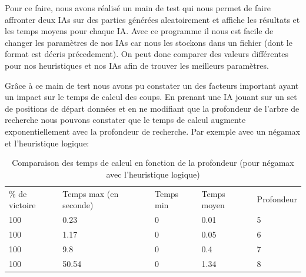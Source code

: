 \documentclass[12pt]{article}
\begin{document}
Pour ce faire, nous avons réalisé un main de test qui nous permet de faire affronter deux IAs sur des parties générées aleatoirement et affiche les résultats et les temps moyens pour chaque IA. Avec ce programme il nous est facile de changer les paramètres de nos IAs car nous les stockons dans un fichier (dont le format est décris précedement). On peut donc comparer des valeurs différentes pour nos heuristiques et nos IAs afin de trouver les meilleurs paramètres.

Grâce à ce main de test nous avons pu constater un des facteurs important ayant un impact sur le temps de calcul des coups. En prenant une IA jouant sur un set de positions de départ données et en ne modifiant que la profondeur de l'arbre de recherche nous pouvons constater que le temps de calcul augmente exponentiellement avec la profondeur de recherche. Par exemple avec un négamax et l'heuristique logique:
\begin{table}[H]
\centering
\caption{Comparaison des temps de calcul en fonction de la profondeur (pour négamax avec l'heuristique logique)}
\begin{tabular}{l|l|l|l|l}
\% de victoire & Temps max (en seconde) & Temps min & Temps moyen & Profondeur \\
       100     &    0.23                &     0     &     0.01    & 5          \\
       100     &    1.17                &     0     &     0.05    & 6          \\
       100     &    9.8                 &     0     &      0.4    & 7          \\
       100     &    50.54               &     0     &     1.34    & 8
\end{tabular}
\end{table}
\end{document}
